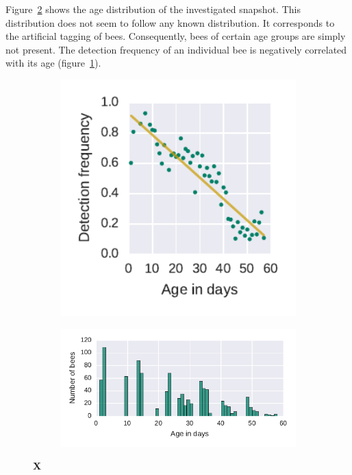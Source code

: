 Figure~\ref{fig:n3ageDist} shows the age distribution of the investigated snapshot. This distribution does not seem to follow any known distribution. It corresponds to the artificial tagging of bees. Consequently, bees of certain age groups are simply not present. The detection frequency of an individual bee is negatively correlated with its age (figure~\ref{fig:n3detfVSage}).


\begin{figure}[htb]
	\centering
	\begin{subfigure}[b]{0.33\textwidth}
	\centering
	\includegraphics[width=1.0\textwidth]{Figures/n3_detFvsAge}
	\caption[]{}
	\label{fig:n3detfVSage}
	\end{subfigure} 
	\begin{subfigure}[b]{0.66\textwidth}
	\centering
	\includegraphics[width=1.0\textwidth]{Figures/n3_ages.pdf}
	\caption[]{}
	\label{fig:n3ageDist}
	\end{subfigure}
	\caption[X]{\textbf{X}}
	\label{fig:ageDetF}
\end{figure}


